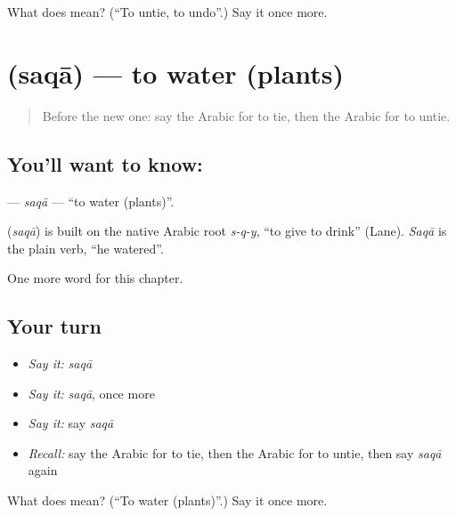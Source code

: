 \begin{tcolorbox}[breakable,colback=teal!4,colframe=teal!35!black,title={Before you move on}]
What does  mean? (\textquotedblleft{}To untie, to undo\textquotedblright{}.) Say it once more.
\end{tcolorbox}
\section[\texorpdfstring{\ar{سقى} (saqā)}{سقى (saqā)}]{ (saqā) — to water (plants)}

\label{lesson:AR-C229-saqa}



\begin{quote}
Before the new one: say the Arabic for to tie, then the Arabic for to untie.
\end{quote}

\subsection*{You'll want to know: }
\textbf{} — \emph{saqā} — \textquotedblleft{}to water (plants)\textquotedblright{}.

\begin{cousinweb}
\textbf{} (\emph{saqā}) is built on the native Arabic root \emph{s-q-y}, \textquotedblleft{}to give to drink\textquotedblright{} (Lane). \emph{Saqā} is the plain verb, \textquotedblleft{}he watered\textquotedblright{}.
\end{cousinweb}

\begin{grammarlens}[title={What you've built}]
One more word for this chapter.
\end{grammarlens}

\subsection*{Your turn}
\begin{itemize}
\raggedright
  \item \emph{Say it:} \emph{saqā}
  \item \emph{Say it:} \emph{saqā}, once more
  \item \emph{Say it:} say \emph{saqā}
  \item \emph{Recall:} say the Arabic for to tie, then the Arabic for to untie, then say \emph{saqā} again
\end{itemize}

\begin{tcolorbox}[breakable,colback=teal!4,colframe=teal!35!black,title={Before you move on}]
What does  mean? (\textquotedblleft{}To water (plants)\textquotedblright{}.) Say it once more.
\end{tcolorbox}
